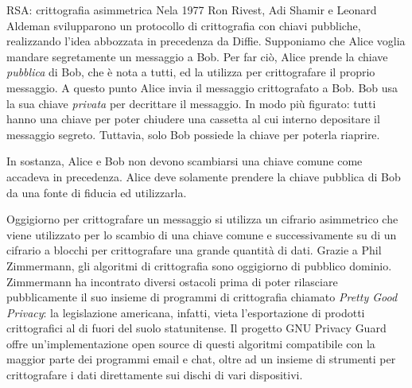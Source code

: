 \documentclass[final,hyperref={pdfpagelabels=false}]{beamer}
\begin{document}
\begin{frame}{}
\begin{columns}[t]
\begin{column}{.3\linewidth}
        \begin{block}{RSA: crittografia asimmetrica}
          Nela 1977 Ron Rivest, Adi Shamir e Leonard Aldeman svilupparono un protocollo di crittografia con chiavi pubbliche, realizzando l'idea abbozzata in precedenza da Diffie. Supponiamo che Alice voglia mandare segretamente un messaggio a Bob. Per far ciò, Alice prende la chiave {\em pubblica} di Bob, che è nota a tutti, ed la utilizza per crittografare il proprio messaggio. A questo punto Alice invia il messaggio crittografato a Bob. Bob usa la sua chiave {\em privata} per decrittare il messaggio. In modo più figurato: tutti hanno una chiave per poter chiudere una cassetta al cui interno depositare il messaggio segreto. Tuttavia, solo Bob possiede la chiave per poterla riaprire. \par
          In sostanza, Alice e Bob non devono scambiarsi una chiave comune come accadeva in precedenza. Alice deve solamente prendere la chiave pubblica di Bob da una fonte di fiducia ed utilizzarla. \par
          Oggigiorno per crittografare un messaggio si utilizza un cifrario asimmetrico che viene utilizzato per lo scambio di una chiave comune e successivamente su di un cifrario a blocchi per crittografare una grande quantità di dati. Grazie a Phil Zimmermann, gli algoritmi di crittografia sono oggigiorno di pubblico dominio. Zimmermann ha incontrato diversi ostacoli prima di poter rilasciare pubblicamente il suo insieme di programmi di crittografia chiamato {\em Pretty Good Privacy}: la legislazione americana, infatti, vieta l'esportazione di prodotti crittografici al di fuori del suolo statunitense. Il progetto GNU Privacy Guard offre un'implementazione open source di questi algoritmi compatibile con la maggior parte dei programmi email e chat, oltre ad un insieme di strumenti per crittografare i dati direttamente sui dischi di vari dispositivi.
        \end{block}


\end{column}
\end{columns}
\end{frame}
\end{document}
